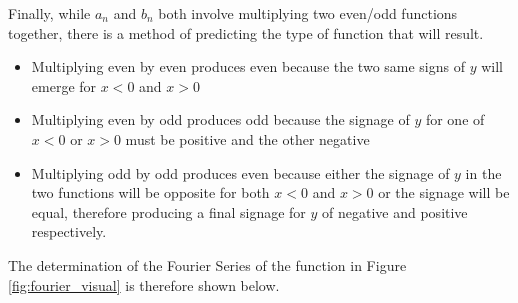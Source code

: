 \documentclass[letterpaper, 12pt]{article}
\begin{document}
Finally, while \(a_n\) and \(b_n\) both involve multiplying
two even/odd functions together, there is a method of
predicting the type of function that will result.

\begin{itemize}
    \item Multiplying even by even produces even because the two same signs of \(y\) will emerge for \(x < 0\) and \(x > 0\)
    \item Multiplying even by odd produces odd because the signage of \(y\) for one of \(x < 0\) or \(x > 0\) must be positive and the other negative
    \item Multiplying odd by odd produces even because either the signage of \(y\) in the two functions will be opposite for both \(x < 0\) and \(x > 0\) or the signage will be equal, therefore producing a final signage for \(y\) of negative and positive respectively.
\end{itemize}

The determination of the Fourier Series of the function in Figure \ref*{fig:fourier_visual}
is therefore shown below.
\end{document}
